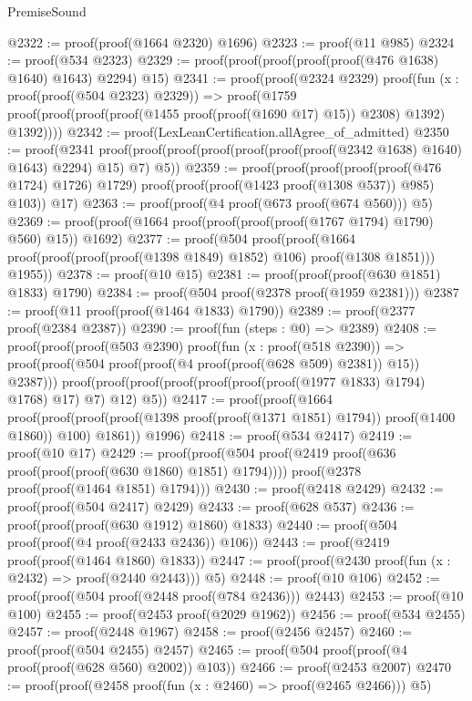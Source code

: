 \begin{lexlean}{PremiseSound}
\begin{coremodule}
@2322 := proof(proof(@1664 @2320) @1696)
@2323 := proof(@11 @985)
@2324 := proof(@534 @2323)
@2329 := proof(proof(proof(proof(proof(@476 @1638) @1640) @1643) @2294) @15)
@2341 := proof(proof(@2324 @2329)
      proof(fun (x : proof(proof(@504 @2323) @2329)) =>
        proof(@1759
            proof(proof(proof(proof(@1455 proof(proof(@1690 @17) @15)) @2308) @1392) @1392))))
@2342 := proof(LexLeanCertification.allAgree_of_admitted)
@2350 := proof(@2341
      proof(proof(proof(proof(proof(proof(proof(@2342 @1638) @1640) @1643) @2294) @15) @7) @5))
@2359 := proof(proof(proof(proof(proof(@476 @1724) @1726) @1729)
        proof(proof(proof(@1423 proof(@1308 @537)) @985) @103))
      @17)
@2363 := proof(proof(@4 proof(@673 proof(@674 @560))) @5)
@2369 := proof(proof(@1664 proof(proof(proof(proof(@1767 @1794) @1790) @560) @15)) @1692)
@2377 := proof(@504
      proof(proof(@1664 proof(proof(proof(proof(@1398 @1849) @1852) @106) proof(@1308 @1851)))
          @1955))
@2378 := proof(@10 @15)
@2381 := proof(proof(proof(@630 @1851) @1833) @1790)
@2384 := proof(@504 proof(@2378 proof(@1959 @2381)))
@2387 := proof(@11 proof(proof(@1464 @1833) @1790))
@2389 := proof(@2377 proof(@2384 @2387))
@2390 := proof(fun (steps : @0) => @2389)
@2408 := proof(proof(proof(@503 @2390)
        proof(fun (x : proof(@518 @2390)) =>
          proof(proof(@504 proof(proof(@4 proof(proof(@628 @509) @2381)) @15)) @2387)))
      proof(proof(proof(proof(proof(proof(proof(@1977 @1833) @1794) @1768) @17) @7) @12) @5))
@2417 := proof(proof(@1664
        proof(proof(proof(proof(@1398 proof(proof(@1371 @1851) @1794)) proof(@1400 @1860)) @100)
            @1861))
      @1996)
@2418 := proof(@534 @2417)
@2419 := proof(@10 @17)
@2429 := proof(proof(@504 proof(@2419 proof(@636 proof(proof(proof(@630 @1860) @1851) @1794))))
      proof(@2378 proof(proof(@1464 @1851) @1794)))
@2430 := proof(@2418 @2429)
@2432 := proof(proof(@504 @2417) @2429)
@2433 := proof(@628 @537)
@2436 := proof(proof(proof(@630 @1912) @1860) @1833)
@2440 := proof(@504 proof(proof(@4 proof(@2433 @2436)) @106))
@2443 := proof(@2419 proof(proof(@1464 @1860) @1833))
@2447 := proof(proof(@2430 proof(fun (x : @2432) => proof(@2440 @2443))) @5)
@2448 := proof(@10 @106)
@2452 := proof(proof(@504 proof(@2448 proof(@784 @2436))) @2443)
@2453 := proof(@10 @100)
@2455 := proof(@2453 proof(@2029 @1962))
@2456 := proof(@534 @2455)
@2457 := proof(@2448 @1967)
@2458 := proof(@2456 @2457)
@2460 := proof(proof(@504 @2455) @2457)
@2465 := proof(@504 proof(proof(@4 proof(proof(@628 @560) @2002)) @103))
@2466 := proof(@2453 @2007)
@2470 := proof(proof(@2458 proof(fun (x : @2460) => proof(@2465 @2466))) @5)

\end{coremodule}
\end{lexlean}
